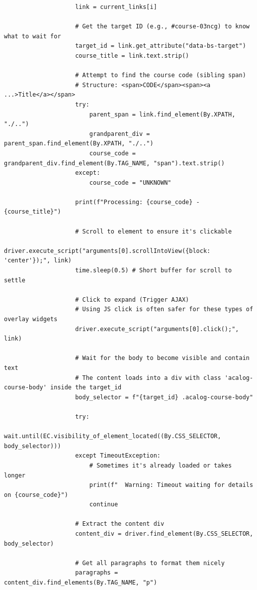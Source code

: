 \documentclass[12pt]{article}
\begin{document}
\begin{lstlisting}
                    link = current_links[i]
                    
                    # Get the target ID (e.g., #course-03ncg) to know what to wait for
                    target_id = link.get_attribute("data-bs-target")
                    course_title = link.text.strip()
                    
                    # Attempt to find the course code (sibling span)
                    # Structure: <span>CODE</span><span><a ...>Title</a></span>
                    try:
                        parent_span = link.find_element(By.XPATH, "./..")
                        grandparent_div = parent_span.find_element(By.XPATH, "./..")
                        course_code = grandparent_div.find_element(By.TAG_NAME, "span").text.strip()
                    except:
                        course_code = "UNKNOWN"

                    print(f"Processing: {course_code} - {course_title}")

                    # Scroll to element to ensure it's clickable
                    driver.execute_script("arguments[0].scrollIntoView({block: 'center'});", link)
                    time.sleep(0.5) # Short buffer for scroll to settle

                    # Click to expand (Trigger AJAX)
                    # Using JS click is often safer for these types of overlay widgets
                    driver.execute_script("arguments[0].click();", link)

                    # Wait for the body to become visible and contain text
                    # The content loads into a div with class 'acalog-course-body' inside the target_id
                    body_selector = f"{target_id} .acalog-course-body"
                    
                    try:
                        wait.until(EC.visibility_of_element_located((By.CSS_SELECTOR, body_selector)))
                    except TimeoutException:
                        # Sometimes it's already loaded or takes longer
                        print(f"  Warning: Timeout waiting for details on {course_code}")
                        continue

                    # Extract the content div
                    content_div = driver.find_element(By.CSS_SELECTOR, body_selector)
                    
                    # Get all paragraphs to format them nicely
                    paragraphs = content_div.find_elements(By.TAG_NAME, "p")
                    

\end{lstlisting}
\end{document}
